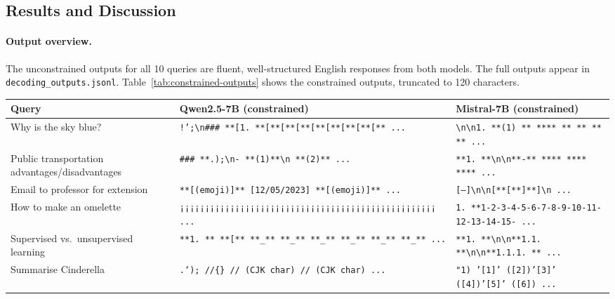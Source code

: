 \documentclass[11pt, a4paper]{article}
\begin{document}
\subsection{Results and Discussion}

\paragraph{Output overview.}
The unconstrained outputs for all 10 queries are fluent, well-structured English
responses from both models. The full outputs appear in
\texttt{decoding\_outputs.jsonl}. Table~\ref{tab:constrained-outputs} shows the
constrained outputs, truncated to 120 characters.

\begin{longtable}{L{3.5cm} L{4cm} L{4cm}}
\toprule
Query & Qwen2.5-7B (constrained) & Mistral-7B (constrained) \\
\midrule
\endhead
\bottomrule
\endfoot
Why is the sky blue?
  & \texttt{!';{\textbackslash}n\#\#\# **[1. **[**[**[**[**[**[**[**[** ...}
  & \texttt{{\textbackslash}n{\textbackslash}n1. **(1) ** **** ** ** ** ** ...} \\[4pt]

Public transportation advantages/disadvantages
  & \texttt{\#\#\# **.);\textbackslash{}n- **(1)**\textbackslash{}n **(2)** ...}
  & \texttt{**1. **\textbackslash{}n\textbackslash{}n**-** **** **** **** ...} \\[4pt]

Email to professor for extension
  & \texttt{**[{\small(emoji)}]** [12/05/2023] **[{\small(emoji)}]** ...}
  & \texttt{[---]\textbackslash{}n\textbackslash{}n[**[**]**]\textbackslash{}n ...} \\[4pt]

How to make an omelette
  & \texttt{¡¡¡¡¡¡¡¡¡¡¡¡¡¡¡¡¡¡¡¡¡¡¡¡¡¡¡¡¡¡¡¡¡¡¡¡¡¡¡¡¡¡¡¡¡¡¡¡¡¡¡ ...}
  & \texttt{1. **1-2-3-4-5-6-7-8-9-10-11-12-13-14-15- ...} \\[4pt]

Supervised vs.\ unsupervised learning
  & \texttt{**1. ** **[** **\_** **\_** **\_** **\_** **\_** **\_** ...}
  & \texttt{**1. **\textbackslash{}n\textbackslash{}n**1.1. **\textbackslash{}n\textbackslash{}n**1.1.1. ** ...} \\[4pt]

Summarise Cinderella
  & \texttt{.`); //\{\} // (CJK char) // (CJK char) ...}
  & \texttt{"1) '[1]' ([2])'[3]' ([4])'[5]' ([6]) ...} \\[4pt]


\end{longtable}
\end{document}
